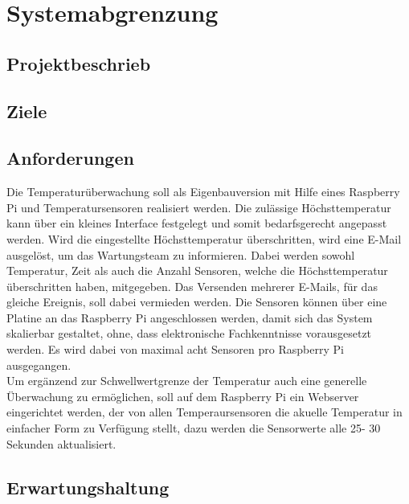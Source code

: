\section{Systemabgrenzung}
\subsection{Projektbeschrieb}
\subsection{Ziele}
\subsection{Anforderungen}
Die Temperaturüberwachung soll als Eigenbauversion mit Hilfe eines Raspberry Pi und Temperatursensoren realisiert werden. Die zulässige Höchsttemperatur kann über ein kleines Interface festgelegt und somit bedarfsgerecht angepasst werden. Wird die eingestellte Höchsttemperatur überschritten, wird eine E-Mail ausgelöst, um das Wartungsteam zu informieren. Dabei werden sowohl Temperatur, Zeit als auch die Anzahl Sensoren, welche die Höchsttemperatur überschritten haben, mitgegeben. Das Versenden mehrerer E-Mails, für das gleiche Ereignis, soll dabei vermieden werden. Die Sensoren können über eine Platine an das Raspberry Pi angeschlossen werden, damit sich das System skalierbar gestaltet, ohne, dass elektronische Fachkenntnisse vorausgesetzt werden. Es wird dabei von maximal acht Sensoren pro Raspberry Pi ausgegangen.\\
Um ergänzend zur Schwellwertgrenze der Temperatur auch eine generelle Überwachung zu ermöglichen, soll auf dem Raspberry Pi ein Webserver eingerichtet werden, der von allen Temperaursensoren die akuelle Temperatur in einfacher Form zu Verfügung stellt, dazu werden die Sensorwerte alle 25- 30 Sekunden aktualisiert.
\subsection{Erwartungshaltung}